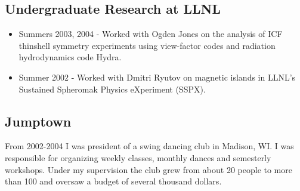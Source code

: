 \documentclass[letterpaper,10pt]{article}
\begin{document}
\subsection*{Undergraduate Research at LLNL}
\begin{itemize}
	\item Summers 2003, 2004 - Worked with Ogden Jones on the analysis of ICF thinshell symmetry experiments using view-factor codes and radiation hydrodynamics code Hydra.
	\item Summer 2002 -  Worked with Dmitri Ryutov on magnetic islands in
		LLNL's Sustained Spheromak Physics eXperiment (SSPX).
\end{itemize}


\subsection*{Jumptown}
From 2002-2004 I was president of a swing dancing club in Madison, WI.  I was
responsible for organizing weekly classes, monthly dances and semesterly
workshops.  Under my supervision the club grew from about 20 people to more
than 100 and oversaw a budget of several thousand dollars.
\end{document}
